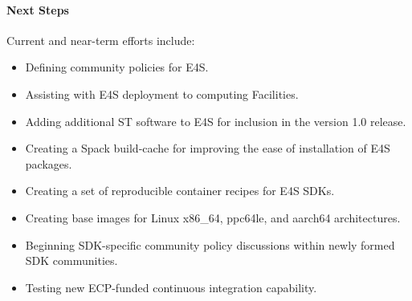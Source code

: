 

\paragraph{Next Steps}
Current and near-term efforts include:

\begin{itemize}
\item  Defining community policies for E4S.
\item  Assisting with E4S deployment to computing Facilities.
\item  Adding additional ST software to E4S for inclusion in the version 1.0 release.
\item  Creating a Spack build-cache for improving the ease of installation of E4S packages. 
\item  Creating a set of reproducible container recipes for E4S SDKs.
\item  Creating base images for Linux x86\_64, ppc64le, and aarch64 architectures.
\item  Beginning SDK-specific community policy discussions within newly formed SDK communities.
\item  Testing new ECP-funded continuous integration capability.
\end{itemize}

